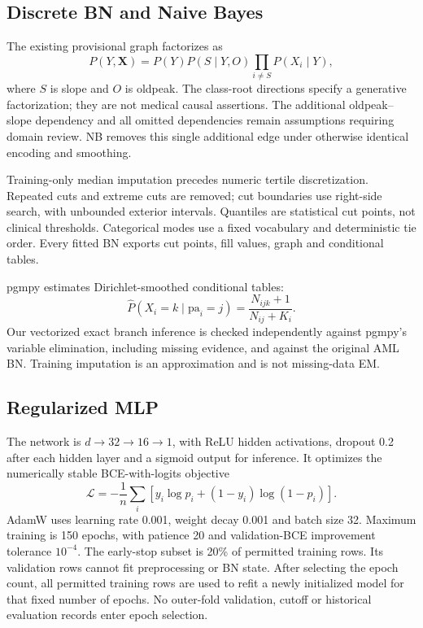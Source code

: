 \documentclass[conference]{IEEEtran}
\begin{document}
\subsection{Discrete BN and Naive Bayes}
The existing provisional graph factorizes as
\begin{equation}
P(Y,\mathbf X)=P(Y)P(S\mid Y,O)\prod_{i\ne S}P(X_i\mid Y),
\end{equation}
where $S$ is slope and $O$ is oldpeak. The class-root directions specify a generative factorization; they are not medical causal assertions. The additional oldpeak--slope dependency and all omitted dependencies remain assumptions requiring domain review. NB removes this single additional edge under otherwise identical encoding and smoothing.

Training-only median imputation precedes numeric tertile discretization. Repeated cuts and extreme cuts are removed; cut boundaries use right-side search, with unbounded exterior intervals. Quantiles are statistical cut points, not clinical thresholds. Categorical modes use a fixed vocabulary and deterministic tie order. Every fitted BN exports cut points, fill values, graph and conditional tables.

pgmpy estimates Dirichlet-smoothed conditional tables:
\begin{equation}
\widehat P(X_i=k\mid \mathrm{pa}_i=j)=\frac{N_{ijk}+1}{N_{ij}+K_i}.
\end{equation}
Our vectorized exact branch inference is checked independently against pgmpy's variable elimination, including missing evidence, and against the original AML BN. Training imputation is an approximation and is not missing-data EM.
\subsection{Regularized MLP}
The network is $d\rightarrow32\rightarrow16\rightarrow1$, with ReLU hidden activations, dropout 0.2 after each hidden layer and a sigmoid output for inference. It optimizes the numerically stable BCE-with-logits objective
\begin{equation}
\mathcal L=-\frac{1}{n}\sum_i[y_i\log p_i+(1-y_i)\log(1-p_i)].
\end{equation}
AdamW uses learning rate 0.001, weight decay 0.001 and batch size 32. Maximum training is 150 epochs, with patience 20 and validation-BCE improvement tolerance $10^{-4}$. The early-stop subset is 20\% of permitted training rows. Its validation rows cannot fit preprocessing or BN state. After selecting the epoch count, all permitted training rows are used to refit a newly initialized model for that fixed number of epochs. No outer-fold validation, cutoff or historical evaluation records enter epoch selection.
\end{document}

